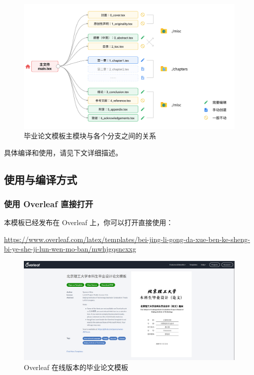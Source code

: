 \begin{figure}[H]
  \center
  \includegraphics[width=\textwidth]{images/grad_thesis.png}
  \caption{毕业论文模板主模块与各个分支之间的关系}
  \label{grad_thesis_main_submodule}
\end{figure}

具体编译和使用，请见下文详细描述。

\subsection{使用与编译方式}

\subsubsection{使用 Overleaf 直接打开}

本模板已经发布在 Overleaf 上，你可以打开直接使用：

\begin{center}
  \color{ForestGreen}\href{https://www.overleaf.com/latex/templates/bei-jing-li-gong-da-xue-ben-ke-sheng-bi-ye-she-ji-lun-wen-mo-ban/mwhjgqsncxxg}{https://www.overleaf.com/latex/templates/bei-jing-li-gong-da-xue-ben-ke-sheng-bi-ye-she-ji-lun-wen-mo-ban/mwhjgqsncxxg}
\end{center}

\begin{figure}[H]
  \centering
  \includegraphics[width=\textwidth]{images/overleaf_grad_thesis.png}
  \caption{Overleaf 在线版本的毕业论文模板}
\end{figure}

